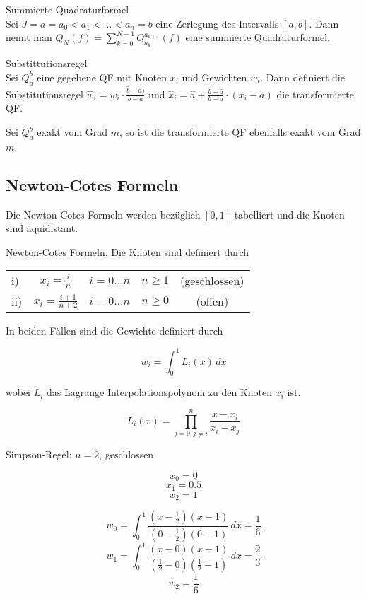 \begin{definition}
	[Definition I.3] Summierte Quadraturformel
	\\
	Sei $J={a=a_{0}<a_{1}<\ldots <a_{n}=b}$ eine Zerlegung des Intervalls $[a,b]$. 
	Dann nennt man $Q_{N}(f)=\sum_{k=0}^{N-1}Q_{a_{k}}^{a_{k+1}}(f)$ eine summierte Quadraturformel.
	
\end{definition}
\begin{definition}
[Definition I.4] Substittutionsregel
\\
Sei $Q_{a}^{b}$ eine gegebene QF mit Knoten $x_{i}$ und Gewichten $w_{i}$. Dann definiert die Substitutionsregel
$\hat w_{i}=w_{i}\cdot\frac{\hat b-\hat a)}{b-a}$ und $\hat x_{i}=\hat a+\frac{\hat b - \hat a}{b-a}\cdot(x_{i}-a)$
die transformierte QF.
\end{definition}
\begin{theorem}
[Satz I.2] Sei $Q_{a}^{b}$ exakt vom Grad $m$, so ist die transformierte QF ebenfalls exakt vom Grad $m$.
\end{theorem}
\subsection{Newton-Cotes Formeln}

Die Newton-Cotes Formeln werden bezüglich $[0, 1]$ tabelliert und die Knoten sind äquidistant.

\begin{definition}[Definition I.5] Newton-Cotes Formeln. Die Knoten sind definiert durch

	\begin{tabular}{ l c c c c }
		i) & $x_i = \frac{i}{n}$ & $i=0...n$ & $n \ge 1$ & (geschlossen) \\
		ii) & $x_i = \frac{i+1}{n+2}$ & $i=0...n$ & $n \ge 0$ & (offen) \\
	\end{tabular}
	
	In beiden Fällen sind die Gewichte definiert durch
	
	$$w_i = \int^1_0\!L_i(x) \,dx$$	
	
	wobei $L_i$ das Lagrange Interpolationspolynom zu den Knoten $x_i$ ist.
	
	$$L_i(x) = \prod_{j=0, j \ne i}^n \frac{x-x_i}{x_i-x_j}$$
\end{definition}

\begin{example} Simpson-Regel: $n=2$, geschlossen.

	$$x_0 = 0$$ 
	$$x_1 = 0.5$$
	$$x_2 = 1$$
	
	$$w_0 = \int_0^1\!\frac{(x-\frac{1}{2})(x-1)}{(0-\frac{1}{2})(0-1)}\,dx = \frac{1}{6}$$ 
	$$w_1 = \int_0^1\!\frac{(x-0)(x-1)}{(\frac{1}{2}-0)(\frac{1}{2}-1)}\,dx = \frac{2}{3}$$ 
	$$w_2 = \frac{1}{6}$$
	
\end{example}

